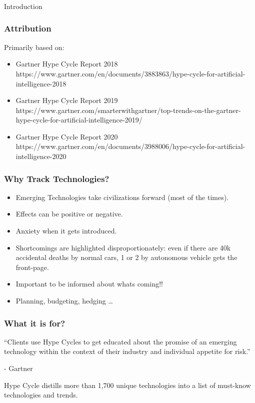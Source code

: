 \begin{frame}[fragile]\frametitle{}
\begin{center}
{\Large Introduction}
\end{center}
\end{frame}

\begin{frame}[fragile]\frametitle{Attribution}

Primarily based on:
\begin{itemize}
\item Gartner Hype Cycle Report 2018 {\tiny https://www.gartner.com/en/documents/3883863/hype-cycle-for-artificial-intelligence-2018}
\item Gartner Hype Cycle Report 2019 {\tiny https://www.gartner.com/smarterwithgartner/top-trends-on-the-gartner-hype-cycle-for-artificial-intelligence-2019/}
\item Gartner Hype Cycle Report 2020 {\tiny https://www.gartner.com/en/documents/3988006/hype-cycle-for-artificial-intelligence-2020}
\end{itemize}
\end{frame}


\begin{frame}[fragile]\frametitle{Why Track Technologies?}

\begin{itemize}
\item Emerging Technologies take civilizations forward (most of the times).
\item Effects can be positive or negative. 
\item Anxiety when it gets introduced.
\item Shortcomings are highlighted disproportionately: even if there are 40k accidental deaths by normal cars, 1 or 2 by autonomous vehicle gets the front-page.
\item Important to be informed about whats coming!!
\item Planning, budgeting, hedging \ldots
\end{itemize}
\end{frame}

\begin{frame}[fragile]\frametitle{What it is for?}

``Clients use Hype Cycles to get educated about the promise of an emerging technology within the context of their industry and individual appetite for risk.''

- Gartner 

Hype Cycle distills more than 1,700 unique technologies into a list of must-know technologies and trends.

\end{frame}


